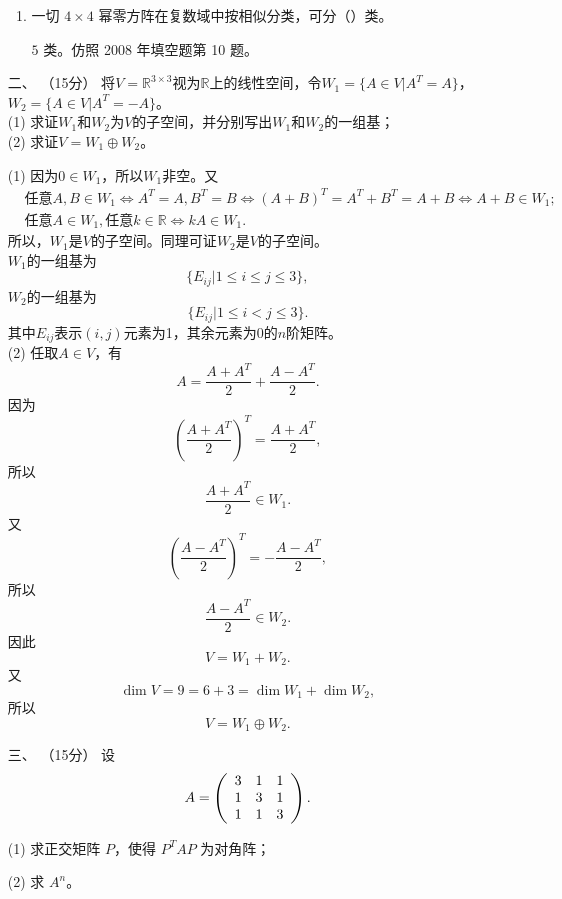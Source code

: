 \begin{enumerate}[1~]
\begin{enumerate}[1.~]
\item
一切 $4\times 4$ 幂零方阵在复数域中按相似分类，可分（\quad）类。

\begin{solution}
$5$ 类。仿照 2008 年填空题第 10 题。
\end{solution}

\end{enumerate}

\item[二、]（15分）
将$V = \mathbb{R} ^ { 3 \times 3 }$视为$\mathbb{R}$上的线性空间，令$W _ { 1 } = \{ A \in V | A ^ { T } = A \}$，$W _ { 2 } = \{ A \in V | A ^ { T } = -A \}$。\\
(1) 求证$W_1$和$W_2$为$V$的子空间，并分别写出$W_1$和$W_2$的一组基；\\
(2) 	求证$V=W_1\oplus W_2$。
\begin{solution}
(1) 因为$0\in W_1$，所以$W_1$非空。又\begin{align*}
&\text{任意} A, B\in W_1 \Longleftrightarrow  A^T=A, B^T=B \Longleftrightarrow  (A+B)^T=A^T+B^T=A+B \Longleftrightarrow  A+B\in W_1;\\
&\text{任意}A\in W_1, \text{任意}k\in\mathbb{R}\Longleftrightarrow  kA\in W_1.
\end{align*}
所以，$W_1$是$V$的子空间。同理可证$W_2$是$V$的子空间。\\
$W_1$的一组基为\[
\{E_{ij}|1\le i\le j\le 3\},
\]
$W_2$的一组基为\[
\{E_{ij}|1\le i<j \le 3\}.
\]
其中$E_{ij}$表示$(i, j)$元素为1，其余元素为0的$n$阶矩阵。  \\
(2) 任取$A\in V$，有\[
A=\frac{A+A^T}{2}+\frac{A-A^T}{2}.
\]
因为\[
\left(\frac{A+A^T}{2}\right)^T=\frac{A+A^T}{2},
\]
所以\[
\frac{A+A^T}{2}\in W_1.
\]
又\[
\left(\frac{A-A^T}{2}\right)^T=-\frac{A-A^T}{2},
\]
所以\[
\frac{A-A^T}{2}\in W_2.
\]
因此\[
V=W_1+W_2.
\]
又\[
\dim V=9=6+3=\dim W_1+\dim W_2,
\]
所以\[
V=W_1\oplus W_2.
\]
\end{solution}

\item[三、]（15分）
设
$$
A = \left( \begin{array} { l l l } { 3 } & { 1 } & { 1 } \\ { 1 } & { 3 } & { 1 } \\ { 1 } & { 1 } & { 3 } \end{array} \right).
$$

(1) 求正交矩阵 $P$，使得 $P^TAP$ 为对角阵；

(2) 求 $A^n$。


\end{enumerate}
